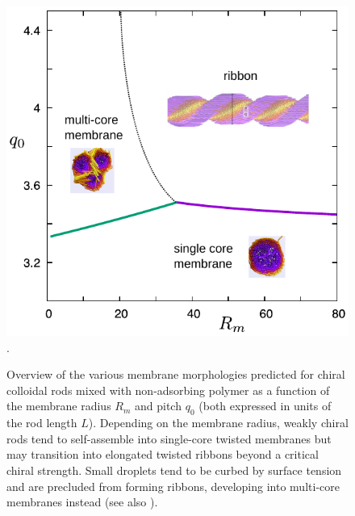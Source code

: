 \begin{figure}
\begin{center}
\includegraphics[width=  0.7 \columnwidth]{figures/chapter-5/emergent}.
\caption[Overview of the various membrane morphologies predicted for chiral colloidal rods mixed with non-adsorbing polymer]{ \label{emergent} Overview of the various membrane morphologies predicted for chiral colloidal rods mixed with non-adsorbing polymer as a function of the membrane radius $R_{m}$  and pitch $q_{0}$ (both expressed in units of the rod length $L$). Depending on the membrane radius,  weakly chiral rods tend to self-assemble into single-core twisted membranes but may transition into elongated twisted ribbons beyond a critical chiral strength. Small droplets tend to be curbed by surface tension and are precluded from forming ribbons,  developing into multi-core membranes instead (see also ).   }
\end{center}
\end{figure}


